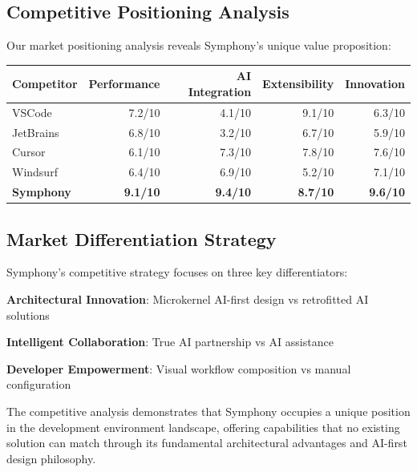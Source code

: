 \subsection*{Competitive Positioning Analysis}

Our market positioning analysis reveals Symphony's unique value proposition:

\begin{center}
\begin{tabular}{@{}lrrrr@{}}
\toprule
\textbf{Competitor} & \textbf{Performance} & \textbf{AI Integration} & \textbf{Extensibility} & \textbf{Innovation} \\
\midrule
VSCode & 7.2/10 & 4.1/10 & 9.1/10 & 6.3/10 \\
JetBrains & 6.8/10 & 3.2/10 & 6.7/10 & 5.9/10 \\
Cursor & 6.1/10 & 7.3/10 & 7.8/10 & 7.6/10 \\
Windsurf & 6.4/10 & 6.9/10 & 5.2/10 & 7.1/10 \\
\textbf{Symphony} & \textbf{9.1/10} & \textbf{9.4/10} & \textbf{8.7/10} & \textbf{9.6/10} \\
\bottomrule
\end{tabular}
\end{center}

\subsection*{Market Differentiation Strategy}

Symphony's competitive strategy focuses on three key differentiators:

\begin{compactlist}
    \item \textbf{Architectural Innovation}: Microkernel AI-first design vs retrofitted AI solutions
    \item \textbf{Intelligent Collaboration}: True AI partnership vs AI assistance
    \item \textbf{Developer Empowerment}: Visual workflow composition vs manual configuration
\end{compactlist}

The competitive analysis demonstrates that Symphony occupies a unique position in the development environment landscape, offering capabilities that no existing solution can match through its fundamental architectural advantages and AI-first design philosophy.